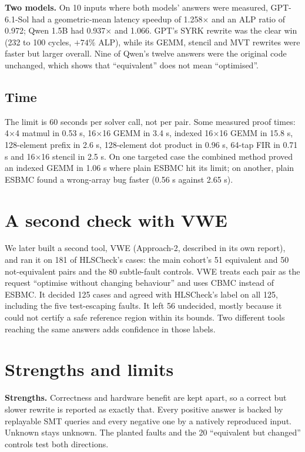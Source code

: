 \documentclass[10pt,a4paper]{article}
\begin{document}
\textbf{Two models.} On 10 inputs where both models' answers were measured, GPT-6.1-Sol had a
geometric-mean latency speedup of 1.258$\times$ and an ALP ratio of 0.972; Qwen 1.5B had 0.937$\times$ and
1.066. GPT's SYRK rewrite was the clear win (232 to 100 cycles, $+74\%$ ALP), while its GEMM, stencil
and MVT rewrites were faster but larger overall. Nine of Qwen's twelve answers were the original code
unchanged, which shows that ``equivalent'' does not mean ``optimised''.

\subsection{Time}
The limit is 60 seconds per solver call, not per pair. Some measured proof times: 4$\times$4 matmul in
0.53 s, 16$\times$16 GEMM in 3.4 s, indexed 16$\times$16 GEMM in 15.8 s, 128-element prefix in 2.6 s,
128-element dot product in 0.96 s, 64-tap FIR in 0.71 s and 16$\times$16 stencil in 2.5 s. On one
targeted case the combined method proved an indexed GEMM in 1.06 s where plain ESBMC hit its limit;
on another, plain ESBMC found a wrong-array bug faster (0.56 s against 2.65 s).

\section{A second check with VWE}
We later built a second tool, VWE (Approach-2, described in its own report), and ran it on 181 of HLSCheck's cases: the main
cohort's 51 equivalent and 50 not-equivalent pairs and the 80 subtle-fault controls. VWE treats each
pair as the request ``optimise without changing behaviour'' and uses CBMC instead of ESBMC. It
decided 125 cases and agreed with HLSCheck's label on all 125, including the five test-escaping
faults. It left 56 undecided, mostly because it could not certify a safe reference region within its
bounds. Two different tools reaching the same answers adds confidence in those labels.

\section{Strengths and limits}
\textbf{Strengths.} Correctness and hardware benefit are kept apart, so a correct but slower rewrite
is reported as exactly that. Every positive answer is backed by replayable SMT queries and every
negative one by a natively reproduced input. Unknown stays unknown. The planted faults and the 20
``equivalent but changed'' controls test both directions.
\end{document}
